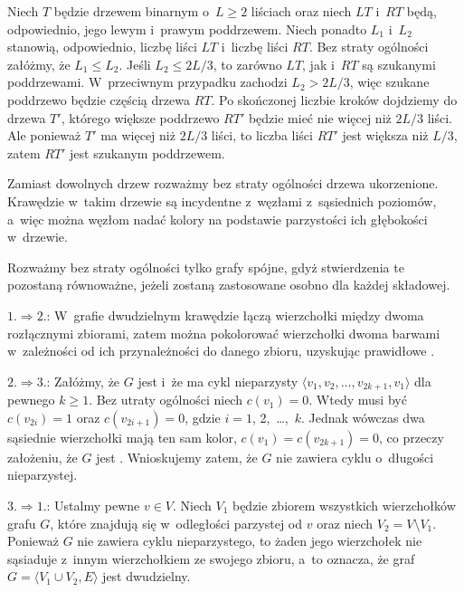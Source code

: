 \noindent Niech $T$ będzie drzewem binarnym o~$L\ge2$ liściach oraz niech $LT$ i~$RT$ będą, odpowiednio, jego lewym i~prawym poddrzewem. Niech ponadto $L_1$ i~$L_2$ stanowią, odpowiednio, liczbę liści $LT$ i~liczbę liści $RT$. Bez straty ogólności załóżmy, że $L_1\le L_2$. Jeśli $L_2\le2L/3$, to zarówno $LT$, jak i~$RT$ są szukanymi poddrzewami. W~przeciwnym przypadku zachodzi $L_2>2L/3$, więc szukane poddrzewo będzie częścią drzewa $RT$. Po skończonej liczbie kroków dojdziemy do drzewa $T'$, którego większe poddrzewo $RT'$ będzie mieć nie więcej niż $2L/3$ liści. Ale ponieważ $T'$ ma więcej niż $2L/3$ liści, to liczba liści $RT'$ jest większa niż $L/3$, zatem $RT'$ jest szukanym poddrzewem.

\problems


\subproblem %
Zamiast dowolnych drzew rozważmy bez straty ogólności drzewa ukorzenione. Krawędzie w~takim drzewie są incydentne z~węzłami z~sąsiednich poziomów, a~więc można węzłom nadać kolory na podstawie parzystości ich głębokości w~drzewie.

\subproblem %
Rozważmy bez straty ogólności tylko grafy spójne, gdyż stwierdzenia te pozostaną równoważne, jeżeli zostaną zastosowane osobno dla każdej składowej.
\medskip

$1.\Rightarrow 2.$: W~grafie dwudzielnym krawędzie łączą wierzchołki między dwoma rozłącznymi zbiorami, zatem można pokolorować wierzchołki dwoma barwami w~zależności od ich przynależności do danego zbioru, uzyskując prawidłowe .
\medskip

$2.\Rightarrow 3.$: Załóżmy, że $G$ jest  i~że ma cykl nieparzysty $\langle v_1,v_2,\dots,v_{2k+1},v_1\rangle$ dla pewnego $k\ge1$. Bez utraty ogólności niech $c(v_1)=0$. Wtedy musi być $c(v_{2i})=1$ oraz $c(v_{2i+1})=0$, gdzie $i=1$, 2,~\dots,~$k$. Jednak wówczas dwa sąsiednie wierzchołki mają ten sam kolor, $c(v_1)=c(v_{2k+1})=0$, co przeczy założeniu, że $G$ jest . Wnioskujemy zatem, że $G$ nie zawiera cyklu o~długości nieparzystej.
\medskip

$3.\Rightarrow 1.$: Ustalmy pewne $v\in V$. Niech $V_1$ będzie zbiorem wszystkich wierzchołków grafu $G$, które znajdują się w~odległości parzystej od $v$ oraz niech $V_2=V\setminus V_1$. Ponieważ $G$ nie zawiera cyklu nieparzystego, to żaden jego wierzchołek nie sąsiaduje z~innym wierzchołkiem ze swojego zbioru, a~to oznacza, że graf $G=\langle V_1\cup V_2,E\rangle$ jest dwudzielny.

